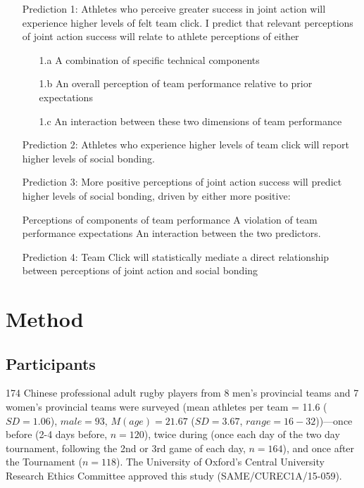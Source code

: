\begin{itemize}
  \item[Prediction 1:] Athletes who perceive greater success in joint action will experience higher levels of felt team click. I predict that relevant perceptions of joint action success will relate to athlete perceptions of either
      \begin{itemize}
        \item[1.a] A combination of specific technical components
        \item[1.b] An overall perception of team performance relative to prior expectations
        \item[1.c] An interaction between these two dimensions of team performance
      \end{itemize}
  \item[Prediction 2:] Athletes who experience higher levels of team click will report higher levels of social bonding.
  \item[Prediction 3:] More positive perceptions of joint action success will predict higher levels of social bonding, driven by either more positive:
    \begin{itemize}
        \itemize[3.b] Perceptions of components of team performance
    	  \itemize[3.b] A violation of team performance expectations
        \itemize[3.c] An interaction between the two predictors.
    \end{itemize}
  \item[Prediction 4:] Team Click will statistically mediate a direct relationship between perceptions of joint action and social bonding
\end{itemize}



\section{Method}
\subsection{Participants}
174 Chinese professional adult rugby players from 8 men’s provincial teams and 7 women’s provincial teams were surveyed  (mean athletes per team = 11.6 ($SD =1.06$), $male = 93$, $M(age) = 21.67$ ($SD = 3.67$, $range = 16 - 32$))---once before (2-4 days before, $n = 120$), twice during (once each day of the two day tournament, following the 2nd or 3rd game of each day, $n = 164$), and once after the Tournament ($n = 118$).  The University of Oxford’s Central University Research Ethics Committee approved this study (SAME/CUREC1A/15-059).

